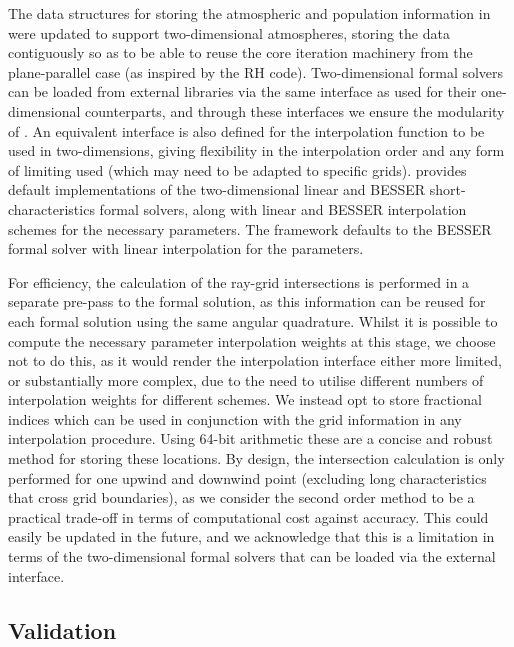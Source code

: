 The data structures for storing the atmospheric and population information in \Lw{} were updated to support two-dimensional atmospheres, storing the data contiguously so as to be able to reuse the core iteration machinery from the plane-parallel case (as inspired by the RH code).
Two-dimensional formal solvers can be loaded from external libraries via the same interface as used for their one-dimensional counterparts, and through these interfaces we ensure the modularity of \Lw{}.
An equivalent interface is also defined for the interpolation function to be used in two-dimensions, giving flexibility in the interpolation order and any form of limiting used (which may need to be adapted to specific grids).
\Lw{} provides default implementations of the two-dimensional linear and BESSER short-characteristics formal solvers, along with linear and BESSER interpolation schemes for the necessary parameters.
The framework defaults to the BESSER formal solver with linear interpolation for the parameters.

For efficiency, the calculation of the ray-grid intersections is performed in a separate pre-pass to the formal solution, as this information can be reused for each formal solution using the same angular quadrature.
Whilst it is possible to compute the necessary parameter interpolation weights at this stage, we choose not to do this, as it would render the interpolation interface either more limited, or substantially more complex, due to the need to utilise different numbers of interpolation weights for different schemes.
We instead opt to store fractional indices which can be used in conjunction with the grid information in any interpolation procedure.
Using 64-bit arithmetic these are a concise and robust method for storing these locations.
By design, the intersection calculation is only performed for one upwind and downwind point
(excluding long characteristics that cross grid boundaries), as we consider the second order method to be a practical trade-off in terms of computational cost against accuracy.
This could easily be updated in the future, and we acknowledge that this is a limitation in terms of the two-dimensional formal solvers that can be loaded via the external interface.


\subsection{Validation}


